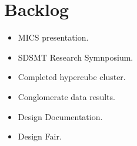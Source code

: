 \documentclass{article}
\begin{document}
\section*{Backlog}
\begin{itemize}
	\item MICS presentation.
	\item SDSMT Research Symnposium.
	\item Completed hypercube cluster.
	\item Conglomerate data results.
	\item Design Documentation.
	\item Design Fair.
\end{itemize}
\end{document}

